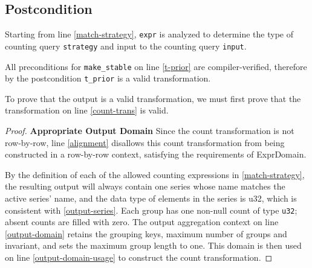 \documentclass{article}
\begin{document}
\subsection*{Postcondition}
\begin{theorem}
\end{theorem}
Starting from line \ref{match-strategy},
\texttt{expr} is analyzed to determine the type of counting query \texttt{strategy} and input to the counting query \texttt{input}.

All preconditions for \texttt{make\_stable} on line \ref{t-prior} are compiler-verified,
therefore by the postcondition \texttt{t\_prior} is a valid transformation.

To prove that the output is a valid transformation,
we must first prove that the transformation on line \ref{count-trans} is valid.

\begin{proof}
    \textbf{Appropriate Output Domain}
    Since the count transformation is not row-by-row,
    line \ref{alignment} disallows this count transformation from being constructed in a row-by-row context,
    satisfying the requirements of ExprDomain.

    By the definition of each of the allowed counting expressions in \ref{match-strategy},
    the resulting output will always contain one series whose name matches the active series' name,
    and the data type of elements in the series is u32,
    which is consistent with \ref{output-series}.
    Each group has one non-null count of type \texttt{u32}; absent counts are filled with zero.
    The output aggregation context on line \ref{output-domain} retains the grouping keys, maximum number of groups and invariant, and sets the maximum group length to one.
    This domain is then used on line \ref{output-domain-usage} to construct the count transformation.
\end{proof}
\end{document}
